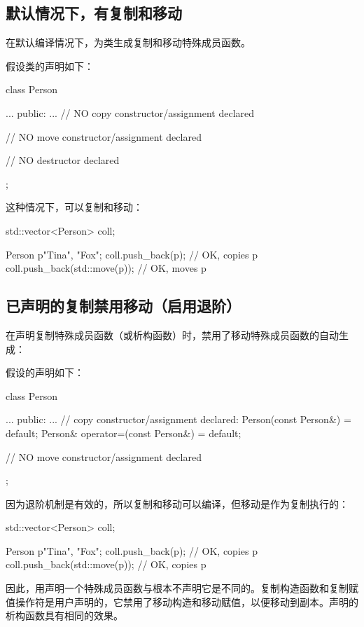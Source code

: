\subsection{默认情况下，有复制和移动}

在默认编译情况下，为类生成复制和移动特殊成员函数。

假设类的声明如下：

\begin{cppcode}
class Person {
	...
public:
	...
	// NO copy constructor/assignment declared

	// NO move constructor/assignment declared

	// NO destructor declared
};
\end{cppcode}

这种情况下，可以复制和移动：

\begin{cppcode}
std::vector<Person> coll;

Person p{"Tina", "Fox"};
coll.push_back(p); // OK, copies p
coll.push_back(std::move(p)); // OK, moves p
\end{cppcode}

\subsection{已声明的复制禁用移动（启用退阶）}

在声明复制特殊成员函数（或析构函数）时，禁用了移动特殊成员函数的自动生成：

假设的声明如下：

\begin{cppcode}
class Person {
	...
public:
	...
	// copy constructor/assignment declared:
	Person(const Person&) = default;
	Person& operator=(const Person&) = default;

	// NO move constructor/assignment declared
};
\end{cppcode}

因为退阶机制是有效的，所以复制和移动可以编译，但移动是作为复制执行的：

\begin{cppcode}
std::vector<Person> coll;

Person p{"Tina", "Fox"};
coll.push_back(p); // OK, copies p
coll.push_back(std::move(p)); // OK, copies p
\end{cppcode}

因此，用声明一个特殊成员函数与根本不声明它是不同的。复制构造函数和复制赋值操作符是用户声明的，它禁用了移动构造和移动赋值，以便移动到副本。声明的析构函数具有相同的效果。

